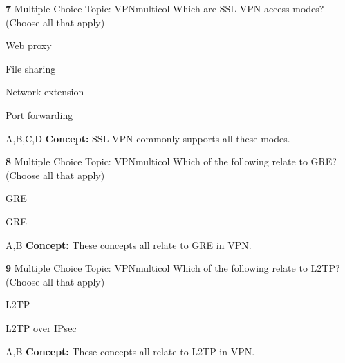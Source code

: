 \documentclass[10pt,a4paper]{article}
\begin{document}
\begin{qcard}{\color{white}\textbf{7} \hfill \small Multiple Choice \textbar{} Topic: VPN}{multicol}
Which are SSL VPN access modes? (Choose all that apply)

\begin{qoptions}
\item Web proxy
\item File sharing
\item Network extension
\item Port forwarding
\end{qoptions}
\begin{explainbox}{A,B,C,D}
\textbf{Concept:} SSL VPN commonly supports all these modes.
\end{explainbox}
\end{qcard}

\begin{qcard}{\color{white}\textbf{8} \hfill \small Multiple Choice \textbar{} Topic: VPN}{multicol}
Which of the following relate to GRE? (Choose all that apply)

\begin{qoptions}
\item GRE
\item GRE
\end{qoptions}
\begin{explainbox}{A,B}
\textbf{Concept:} These concepts all relate to GRE in VPN.
\end{explainbox}
\end{qcard}

\begin{qcard}{\color{white}\textbf{9} \hfill \small Multiple Choice \textbar{} Topic: VPN}{multicol}
Which of the following relate to L2TP? (Choose all that apply)

\begin{qoptions}
\item L2TP
\item L2TP over IPsec
\end{qoptions}
\begin{explainbox}{A,B}
\textbf{Concept:} These concepts all relate to L2TP in VPN.
\end{explainbox}
\end{qcard}
\end{document}
